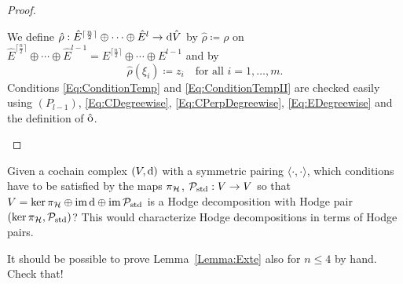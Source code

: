 \documentclass[\MainFolder/Text.tex]{subfiles}
\begin{document}
\begin{proof}
\begin{description}[leftmargin=0pt,font=\normalfont\itshape]
\item[Property $(P_l)$:] We define $\hat{\rho}: \hat{E}^{\lceil \frac{n}{2}\rceil}\oplus\dotsb\oplus\hat{E}^l \rightarrow \mathrm{d}\hat{V}$ by $\hat{\rho} \coloneqq \rho$ on $\hat{E}^{\lceil \frac{n}{2}\rceil}\oplus\dotsb\oplus\hat{E}^{l-1}=E^{\lceil \frac{n}{2}\rceil}\oplus\dotsb\oplus E^{l-1}$ and by
\[
\hat{\rho}(\xi_i) \coloneqq z_i\quad\text{for all }i=1, \dotsc, m.
\]
Conditions \eqref{Eq:ConditionTemp} and \eqref{Eq:ConditionTempII} are checked easily using $(P_{l-1})$, \eqref{Eq:CDegreewise}, \eqref{Eq:CPerpDegreewise}, \eqref{Eq:EDegreewise} and the definition of $\hat{\mathrm{o}}$.\qedhere
%
%
%
%
%
%
\end{description}
\end{proof}

\begin{Questions}\label{Q:QuestOnPoinc}
\begin{RemarkList}
\item Given a cochain complex $(V,\mathrm{d})$ with a symmetric pairing $\langle\cdot,\cdot\rangle$, which conditions have to be satisfied by the maps $\pi_{\mathcal{H}}$, $\mathcal{P}_{\mathrm{std}}: V\rightarrow V$ so that $V=\operatorname{ker} \pi_{\mathcal{H}} \oplus \operatorname{im} \mathrm{d} \oplus \operatorname{im} \mathcal{P}_{\mathrm{std}}$ is a Hodge decomposition with Hodge pair $(\operatorname{ker} \pi_{\mathcal{H}}, \mathcal{P}_{\mathrm{std}})$? This would characterize Hodge decompositions in terms of Hodge pairs.
\item It should be possible to prove Lemma~\ref{Lemma:Exte} also for $n\le 4$ by hand. Check that! 
\qedhere
\end{RemarkList}
\end{Questions}
\end{document}
